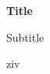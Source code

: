 ﻿\documentclass[a4paper]{report}
\begin{document}
\begin{titlepage}
\begin{center}

{\Huge \textbf{Title}}
\vspace{1cm}

{\LARGE {Subtitle}}

\vspace{1cm}
{\large{ziv}}

\end{center}
\end{titlepage}

\tableofcontents
\newpage
\end{document}
